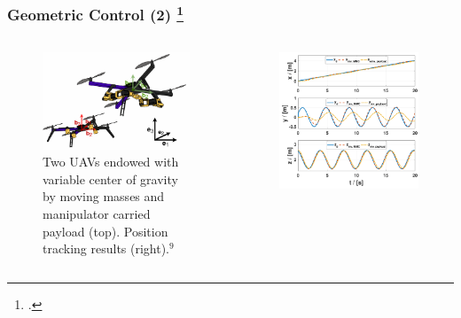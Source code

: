 \begin{frame}
	\frametitle{Geometric Control (2) \footcite{Markovic2019}}
	
	\begin{columns}
		\begin{column}{0.5\textwidth}\centering
			\begin{figure}[H]
				\includegraphics[width=0.8\columnwidth]{figures/uav.png}	
				\centering
				\caption{Two UAVs endowed with variable center of gravity by moving masses and manipulator carried payload (top). Position tracking results (right).${}^{9}$ }
				\label{fig:uav_model}
			\end{figure}
		\end{column}
		
		\begin{column}{0.5\textwidth}\centering
			\begin{figure}
				\centering
				\includegraphics[width=0.95\columnwidth]{figures/both_pos_crop.pdf}
				\label{fig:traj_pos}
			\end{figure}
		\end{column}
	\end{columns}
\end{frame}

